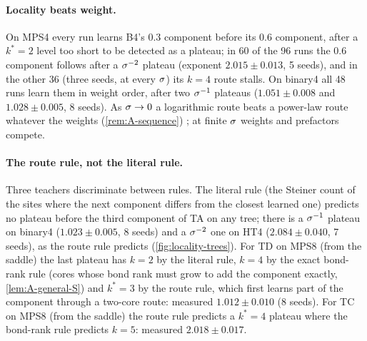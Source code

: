 \paragraph{Locality beats weight.}
\empirical{} On MPS4 every run learns B4's $0.3$ component before its $0.6$ component, after a $k^*=2$ level too
short to be detected as a plateau; in 60 of the 96 runs the $0.6$ component follows after a $\sigma^{-2}$ plateau
(exponent $2.015\pm0.013$, 5 seeds), and in the other 36 (three seeds, at every $\sigma$) its $k=4$ route stalls. On binary4 all 48 runs learn them in weight order, after two $\sigma^{-1}$
plateaus ($1.051\pm0.008$ and $1.028\pm0.005$, 8 seeds). As $\sigma\to0$ a logarithmic route beats a power-law
route whatever the weights (\cref{rem:A-sequence}) \derived; at finite $\sigma$ weights and prefactors compete.
\newresult

\paragraph{The route rule, not the literal rule.}
\empirical{} Three teachers discriminate between rules. The literal rule (the Steiner count of the sites where
the next component differs from the closest learned one) predicts no plateau before the third component of TA on
any tree; there is a $\sigma^{-1}$ plateau on binary4 ($1.023\pm0.005$, 8 seeds) and a $\sigma^{-2}$ one on HT4
($2.084\pm0.040$, 7 seeds), as the route rule predicts (\cref{fig:locality-trees}). For TD on MPS8 (from the
saddle) the last plateau has $k=2$ by the literal rule, $k=4$ by the exact bond-rank rule (cores whose bond rank
must grow to add the component exactly, \cref{lem:A-general-S}) and $k^*=3$ by the route rule, which first
learns part of the component through a two-core route: measured $1.012\pm0.010$ (8 seeds). For TC on MPS8 (from
the saddle) the route rule predicts a $k^*=4$ plateau where the bond-rank rule predicts $k=5$: measured
$2.018\pm0.017$. \newresult

